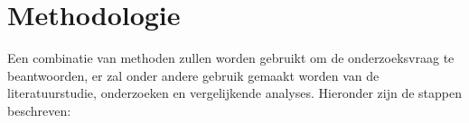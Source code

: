 






\section{Methodologie}%
\label{sec:methodologie}

Een combinatie van methoden zullen worden gebruikt om de onderzoeksvraag te beantwoorden, er zal onder andere gebruik
gemaakt worden van de literatuurstudie, onderzoeken en vergelijkende analyses. Hieronder zijn de stappen beschreven:

